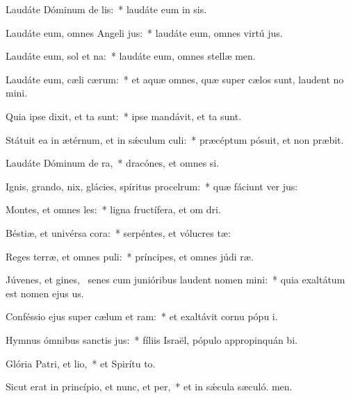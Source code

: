 \item Laudáte Dóminum de lis:~* laudáte eum in sis.
\item Laudáte eum, omnes Angeli jus:~* laudáte eum, omnes virtú jus.
\item Laudáte eum, sol et na:~* laudáte eum, omnes stellæ  men.
\item Laudáte eum, cæli cærum:~* et aquæ omnes, quæ super cælos sunt, laudent no mini.
\item Quia ipse dixit, et ta sunt:~* ipse mandávit, et ta sunt.
\item Státuit ea in ætérnum, et in sǽculum culi:~* præcéptum pósuit, et non præbit.
\item Laudáte Dóminum de ra,~* dracónes, et omnes si.
\item Ignis, grando, nix, glácies, spíritus procelrum:~* quæ fáciunt ver jus:
\item Montes, et omnes les:~* ligna fructífera, et om dri.
\item Béstiæ, et univérsa cora:~* serpéntes, et vólucres tæ:
\item Reges terræ, et omnes puli:~* príncipes, et omnes júdi ræ.
\item Júvenes, et gines,~\pscross{} senes cum junióribus laudent nomen mini:~* quia exaltátum est nomen ejus us.
\item Conféssio ejus super cælum et ram:~* et exaltávit cornu pópu i.
\item Hymnus ómnibus sanctis jus:~* fíliis Israël, pópulo appropinquán bi.
\item Glória Patri, et lio,~* et Spirítu to.
\item Sicut erat in princípio, et nunc, et per,~* et in sǽcula sæculó. men.
